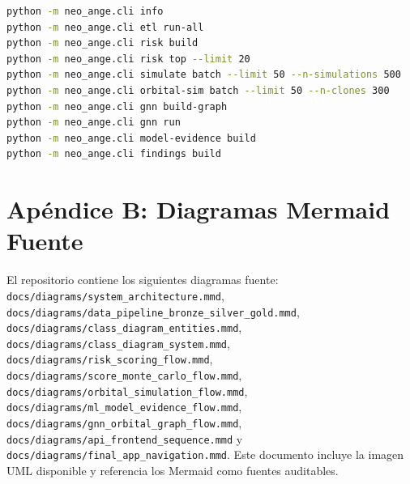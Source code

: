 \documentclass[12pt,a4paper]{report}
\DeclareRobustCommand{\filepath}[1]{\nolinkurl{#1}}
\begin{document}
\begin{lstlisting}[language=bash]
python -m neo_ange.cli info
python -m neo_ange.cli etl run-all
python -m neo_ange.cli risk build
python -m neo_ange.cli risk top --limit 20
python -m neo_ange.cli simulate batch --limit 50 --n-simulations 500
python -m neo_ange.cli orbital-sim batch --limit 50 --n-clones 300
python -m neo_ange.cli gnn build-graph
python -m neo_ange.cli gnn run
python -m neo_ange.cli model-evidence build
python -m neo_ange.cli findings build
\end{lstlisting}

\chapter{Apéndice B: Diagramas Mermaid Fuente}

El repositorio contiene los siguientes diagramas fuente: \filepath{docs/diagrams/system_architecture.mmd}, \filepath{docs/diagrams/data_pipeline_bronze_silver_gold.mmd}, \filepath{docs/diagrams/class_diagram_entities.mmd}, \filepath{docs/diagrams/class_diagram_system.mmd}, \filepath{docs/diagrams/risk_scoring_flow.mmd}, \filepath{docs/diagrams/score_monte_carlo_flow.mmd}, \filepath{docs/diagrams/orbital_simulation_flow.mmd}, \filepath{docs/diagrams/ml_model_evidence_flow.mmd}, \filepath{docs/diagrams/gnn_orbital_graph_flow.mmd}, \filepath{docs/diagrams/api_frontend_sequence.mmd} y \filepath{docs/diagrams/final_app_navigation.mmd}. Este documento incluye la imagen UML disponible y referencia los Mermaid como fuentes auditables.

\cleardoublepage
{}
{}


\end{document}

